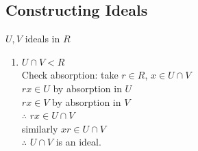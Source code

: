 \subsection*{Constructing Ideals} $U,V$ ideals in $R$
\begin{enumerate}
    \item $U\cap V < R$\steezybreak\\
    Check absorption: take $r\in R$, $x\in U\cap V$\\
    $rx\in U$ by absorption in $U$\\
    $rx\in V$ by absorption in $V$\\
    $\therefore$ $rx\in U\cap V$\\
    similarly $xr \in U \cap V$ \\
    $\therefore$ $U\cap V$ is an ideal.


\end{enumerate}
